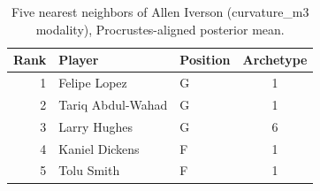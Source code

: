 \begin{table}[htbp]
  \centering\small
  \begin{tabular}{rllc}
    \toprule
    Rank & Player & Position & Archetype \\
    \midrule
    1 & Felipe Lopez & G & 1 \\
    2 & Tariq Abdul-Wahad & G & 1 \\
    3 & Larry Hughes & G & 6 \\
    4 & Kaniel Dickens & F & 1 \\
    5 & Tolu Smith & F & 1 \\
    \bottomrule
  \end{tabular}
  \caption{Five nearest neighbors of Allen Iverson (curvature_m3 modality), Procrustes-aligned posterior mean.}
  \label{tab:Allen_Iverson_neighbors_curvature_m3}
\end{table}

